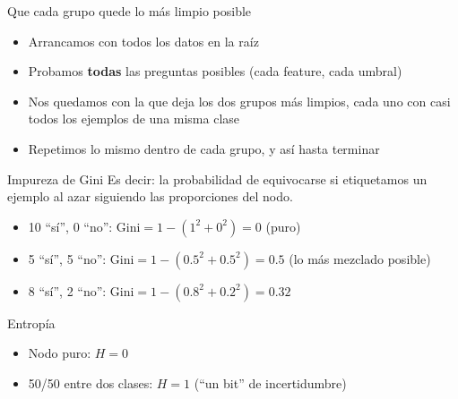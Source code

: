 \begin{frame}{Que cada grupo quede lo más limpio posible}
  \begin{itemize}
    \item Arrancamos con todos los datos en la raíz
    \item Probamos \textbf{todas} las preguntas posibles (cada feature, cada
      umbral)
    \item Nos quedamos con la que deja los dos grupos más limpios, cada uno
      con casi todos los ejemplos de una misma clase
    \item Repetimos lo mismo dentro de cada grupo, y así hasta terminar
  \end{itemize}
  \pause
\end{frame}

\begin{frame}{Impureza de Gini}
  Es decir: la probabilidad de equivocarse si etiquetamos un ejemplo
  al azar siguiendo las proporciones del nodo.
  \begin{itemize}
    \item 10 ``sí'', 0 ``no'': $\text{Gini} = 1 - (1^2 + 0^2) = 0$
      \quad (puro)
    \item 5 ``sí'', 5 ``no'': $\text{Gini} = 1 - (0.5^2 + 0.5^2) = 0.5$
      \quad (lo más mezclado posible)
    \item 8 ``sí'', 2 ``no'': $\text{Gini} = 1 - (0.8^2 + 0.2^2) = 0.32$
  \end{itemize}
\end{frame}

\begin{frame}{Entropía}
  \begin{itemize}
    \item Nodo puro: $H = 0$
    \item 50/50 entre dos clases: $H = 1$ (``un bit'' de incertidumbre)
  \end{itemize}
  \pause
\end{frame}


